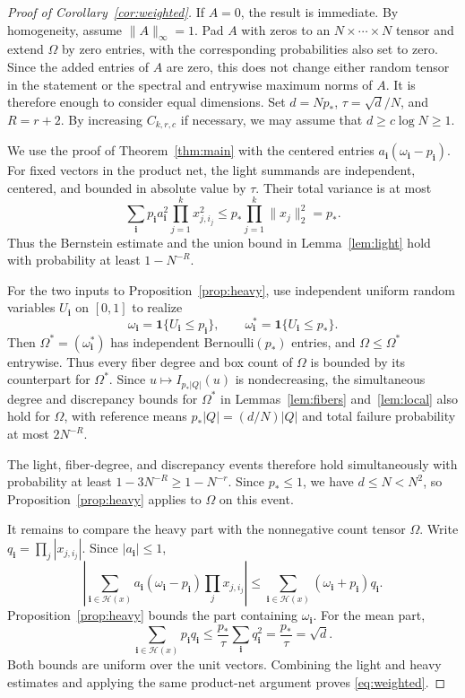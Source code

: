 \documentclass[11pt,reqno]{amsart}
\numberwithin{equation}{section}
\theoremstyle{definition}
\theoremstyle{remark}
\newcommand{\one}{\mathbf 1}
\begin{document}
\begin{proof}[Proof of Corollary~\ref{cor:weighted}]
If $A=0$, the result is immediate. By homogeneity, assume
$\|A\|_\infty=1$.
Pad $A$ with zeros to an $N\times\cdots\times N$ tensor and extend
$\Omega$ by zero entries, with the corresponding probabilities also
set to zero. Since the added entries
of $A$ are zero, this does not change either random tensor in the
statement or the spectral and entrywise maximum norms of $A$. It is
therefore enough to consider equal dimensions. 
Set
$d=Np_*$, $\tau=\sqrt d/N$, and $R=r+2$.
By increasing $C_{k,r,c}$ if necessary, we may assume that
$d\ge c\log N\ge1$.

We use the proof of Theorem~\ref{thm:main} with the centered entries
$a_{\mathbf i}(\omega_{\mathbf i}-p_{\mathbf i})$. For fixed vectors
in the product net, the light summands are independent, centered, and
bounded in absolute value by $\tau$. Their total variance is at most
\[
 \sum_{\mathbf i}p_{\mathbf i}a_{\mathbf i}^2
        \prod_{j=1}^k x_{j,i_j}^2
 \le p_*\prod_{j=1}^k\|x_j\|_2^2=p_*.
\]
Thus the Bernstein estimate and the union bound in
Lemma~\ref{lem:light} hold with  probability at least $1-N^{-R}$.

For the two inputs to Proposition~\ref{prop:heavy}, use independent
uniform random variables $U_{\mathbf i}$ on $[0,1]$ to realize
\[
 \omega_{\mathbf i}=\one\{U_{\mathbf i}\le p_{\mathbf i}\},
 \qquad
 \omega^*_{\mathbf i}=\one\{U_{\mathbf i}\le p_*\}.
\]
Then $\Omega^*=(\omega^*_{\mathbf i})$ has independent
Bernoulli$(p_*)$ entries, and $\Omega\le\Omega^*$ entrywise.
Thus every fiber degree and box count of $\Omega$ is bounded by its
counterpart for $\Omega^*$. Since $u\mapsto I_{p_*|Q|}(u)$ is
nondecreasing, the simultaneous degree and discrepancy bounds for
$\Omega^*$ in Lemmas~\ref{lem:fibers} and~\ref{lem:local} also hold
for $\Omega$, with reference means $p_*|Q|=(d/N)|Q|$ and total failure
probability at most $2N^{-R}$.

The light, fiber-degree, and discrepancy events therefore hold
simultaneously with probability at least
$1-3N^{-R}\ge1-N^{-r}$. Since $p_*\le1$, we have
$d\le N<N^2$, so Proposition~\ref{prop:heavy} applies to $\Omega$
on this event.

It remains to compare the heavy part with the nonnegative count tensor
$\Omega$. Write $q_{\mathbf i}=\prod_j|x_{j,i_j}|$. Since
$|a_{\mathbf i}|\le1$,
\[
 \left|\sum_{\mathbf i\in\mathcal H(x)}
       a_{\mathbf i}(\omega_{\mathbf i}-p_{\mathbf i})
       \prod_jx_{j,i_j}\right|
 \le\sum_{\mathbf i\in\mathcal H(x)}
       (\omega_{\mathbf i}+p_{\mathbf i})q_{\mathbf i}.
\]
Proposition~\ref{prop:heavy} bounds the part containing
$\omega_{\mathbf i}$. For the mean part,
\[
 \sum_{\mathbf i\in\mathcal H(x)}p_{\mathbf i}q_{\mathbf i}
 \le\frac{p_*}{\tau}\sum_{\mathbf i}q_{\mathbf i}^2
 =\frac{p_*}{\tau}=\sqrt d.
\]
Both bounds are uniform over the unit vectors. Combining the light and
heavy estimates and applying the same product-net argument proves
\eqref{eq:weighted}.
\end{proof}
\end{document}
